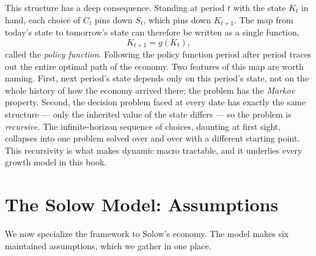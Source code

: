 This structure has a deep consequence. Standing at period $t$ with the state $K_t$ in hand, each choice of $C_t$ pins down $S_t$, which pins down $K_{t+1}$. The map from today's state to tomorrow's state can therefore be written as a single function,
\[
K_{t+1} = g(K_t),
\]
called the \emph{policy function}. Following the policy function period after period traces out the entire optimal path of the economy. Two features of this map are worth naming. First, next period's state depends only on this period's state, not on the whole history of how the economy arrived there; the problem has the \emph{Markov} property. Second, the decision problem faced at every date has exactly the same structure --- only the inherited value of the state differs --- so the problem is \emph{recursive}. The infinite-horizon sequence of choices, daunting at first sight, collapses into one problem solved over and over with a different starting point. This recursivity is what makes dynamic macro tractable, and it underlies every growth model in this book.

\section{The Solow Model: Assumptions}

We now specialize the framework to Solow's economy. The model makes six maintained assumptions, which we gather in one place.


